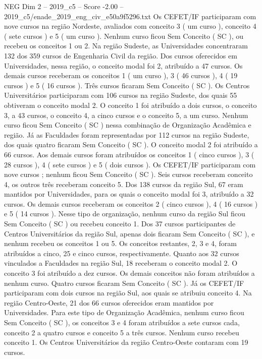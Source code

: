 \begin{textsample}{NEG Dim 2 – 2019\_c5 – Score -2.00 – 2019\_c5/enade\_2019\_eng\_civ\_e50a9f5296.txt}
Os CEFET/IF participaram com nove cursos na região Nordeste, avaliados com conceito 3 ( um curso ), conceito 4 ( sete cursos ) e 5 ( um curso ).
Nenhum curso ficou Sem Conceito ( SC ), ou recebeu os conceitos 1 ou 2.
Na região Sudeste, as Universidades concentraram 132 dos 359 cursos de Engenharia Civil da região.
Dos cursos oferecidos em Universidades, nessa região, o conceito modal foi 2, atribuído a 47 cursos.
Os demais cursos receberam os conceitos 1 ( um curso ), 3 ( 46 cursos ), 4 ( 19 cursos ) e 5 ( 16 cursos ).
Três cursos ficaram Sem Conceito ( SC ).
Os Centros Universitários participaram com 106 cursos na região Sudeste, dos quais 55 obtiveram o conceito modal 2.
O conceito 1 foi atribuído a dois cursos, o conceito 3, a 43 cursos, o conceito 4, a cinco cursos e o conceito 5, a um curso.
Nenhum curso ficou Sem Conceito ( SC ) nessa combinação de Organização Acadêmica e região.
Já as Faculdades foram representadas por 112 cursos na região Sudeste, dos quais quatro ficaram Sem Conceito ( SC ).
O conceito modal 2 foi atribuído a 66 cursos.
Aos demais cursos foram atribuídos os conceitos 1 ( cinco cursos ), 3 ( 28 cursos ), 4 ( sete cursos ) e 5 ( dois cursos ).
Os CEFET/IF participaram com nove cursos ; nenhum ficou Sem Conceito ( SC ).
Seis cursos receberam conceito 4, os outros três receberam conceito 5.
Dos 138 cursos da região Sul, 67 eram mantidos por Universidades, para os quais o conceito modal foi 3, atribuído a 32 cursos.
Os demais cursos receberam os conceitos 2 ( cinco cursos ), 4 ( 16 cursos ) e 5 ( 14 cursos ).
Nesse tipo de organização, nenhum curso da região Sul ficou Sem Conceito ( SC ) ou recebeu conceito 1.
Dos 37 cursos participantes de Centros Universitários da região Sul, apenas dois ficaram Sem Conceito ( SC ), e nenhum recebeu os conceitos 1 ou 5.
Os conceitos restantes, 2, 3 e 4, foram atribuídos a cinco, 25 e cinco cursos, respectivamente.
Quanto aos 32 cursos vinculados a Faculdades na região Sul, 18 receberam o conceito modal 2.
O conceito 3 foi atribuído a dez cursos.
Os demais conceitos não foram atribuídos a nenhum curso.
Quatro cursos ficaram Sem Conceito ( SC ).
Já os CEFET/IF participaram com dois cursos na região Sul, aos quais se atribuiu conceito 4.
Na região Centro-Oeste, 21 dos 66 cursos oferecidos eram mantidos por Universidades.
Para este tipo de Organização Acadêmica, nenhum curso ficou Sem Conceito ( SC ), os conceitos 3 e 4 foram atribuídos a sete cursos cada, conceito 2 a quatro cursos e conceito 5 a três cursos.
Nenhum curso recebeu conceito 1.
Os Centros Universitários da região Centro-Oeste contaram com 19 cursos.

\end{textsample}
